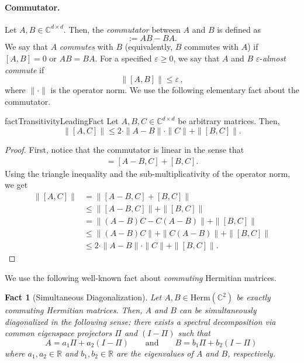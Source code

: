 \documentclass[a4paper,onecolumn,11pt]{quantumarticle}
\theoremstyle{plain}
\newtheorem{fact}[theorem]{Fact}
\newcommand{\eps}{\varepsilon}
\begin{document}
\paragraph{Commutator.} Let $A,B \in \mathbb{C}^{d \times d}$. Then, the \emph{commutator} between $A$ and $B$ is defined as
\begin{equation}
            [A, B] := AB - BA.
        \end{equation}
We say that $A$ \emph{commutes} with $B$ (equivalently, $B$ commutes with $A$) if $[A, B] = 0$ or $AB = BA$. For a specified $\eps \geq 0$, we say that $A$ and $B$ $\eps$-\emph{almost commute} if
\begin{equation}
\|[A,B]\| \leq \eps \, ,
        \end{equation}
where $\|\cdot\|$ is the operator norm.
We use the following elementary fact about the commutator.
\begin{restatable}{fact}{TransitivityLeadingFact}\label{lem:transitivity-of-almost-commutatitivty}
Let $A,B,C \in \mathbb{C}^{d \times d}$ be arbitrary matrices. Then,
\begin{equation}
\| [A,C] \| \leq 2 \cdot \|A-B\| \cdot \|C\|+ \| [B,C]\|.    
\end{equation}
\end{restatable}

\begin{proof}
First, notice that the commutator is linear in the sense that
\begin{align}
[A,C] = [A-B,C] + [B,C].    
\end{align}
Using the triangle inequality and the sub-multiplicativity of the operator norm, we get
\begin{align}
\| [A,C] \| &= \| [A-B,C] + [B,C] \| \\    
&\leq \| [A-B,C]\| + \|[B,C] \| \\
&= \| (A-B)C - C(A-B)\| + \|[B,C] \| \\
&\leq \| (A-B)C\| + \|C(A-B)\| + \|[B,C] \|\\
&\leq 2 \cdot \|A-B\| \cdot \|C\| + \| [B,C]\|.
\end{align}
\end{proof}
\vspace{-0.2cm}We use the following well-known fact about \emph{commuting} Hermitian matrices.

\begin{fact}[Simultaneous Diagonalization]\label{fact:sim-diag}
    Let $A,B \in \mathrm{Herm}(\mathbb{C}^{2})$ be exactly commuting Hermitian matrices. Then, $A$ and $B$ can be \emph{simultaneously diagonalized} in the following sense: there exists a spectral decomposition via common eigenspace \emph{projectors} $\Pi$ and $(I-\Pi)$ such that
    \begin{equation}
        A = a_1 \Pi + a_2 (I -\Pi) \quad\quad \text{and} \quad\quad B = b_1 \Pi + b_2 (I - \Pi) \, 
    \end{equation}
    where $a_1,a_2 \in \mathbb{R}$ and $b_1,b_2 \in \mathbb{R}$ are the eigenvalues of $A$ and $B$, respectively.
\end{fact}
\end{document}
